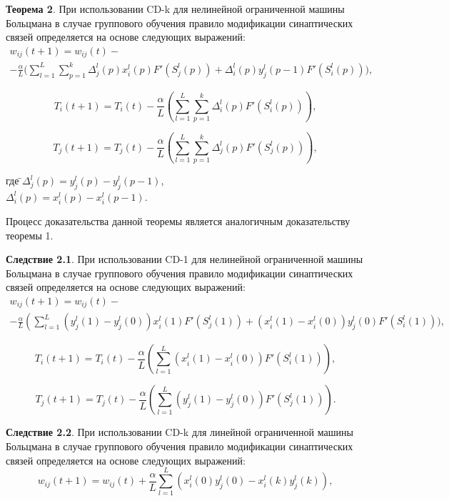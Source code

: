 \textbf{Теорема 2}. При использовании  CD-k для нелинейной ограниченной машины Больцмана в случае группового обучения правило модификации синаптических связей определяется на основе следующих выражений:
\begin{multline*}
    w_{ij}(t+1)=w_{ij}(t)-\\-\frac{\alpha}{L}\Bigg(\sum_{l=1}^L\sum_{p=1}^k\Delta_j^l(p)x_i^l(p)F'(S_j^l(p))+\Delta_i^l(p)y_j^l(p-1)F'(S_i^l(p))\Bigg),
\end{multline*}

\begin{equation*}
    T_{i}(t+1)=T_{i}(t)-\frac{\alpha}{L}\left(\sum_{l=1}^L\sum_{p=1}^k \Delta_i^l(p)F'(S_i^l(p))\right),
\end{equation*}

\begin{equation*}
    T_{j}(t+1)=T_{j}(t)-\frac{\alpha}{L}\left(\sum_{l=1}^L\sum_{p=1}^k \Delta_j^l(p)F'(S_j^l(p))\right),
\end{equation*}
\begin{tabbing}	
где \=$\Delta_j^l(p) = y_j^l(p)-y_j^l(p-1)$,\\
\>$\Delta_i^l(p) = x_i^l(p)-x_i^l(p-1)$.
\end{tabbing}

Процесс доказательства данной теоремы является аналогичным доказательству теоремы 1.

\textbf{Следствие 2.1}. При использовании  CD-1 для нелинейной ограниченной машины Больцмана в случае группового обучения правило модификации синаптических связей определяется на основе следующих выражений:
\begin{multline*}
    w_{ij}(t+1)=w_{ij}(t)-\\-\frac{\alpha}{L}\left(\sum_{l=1}^L (y_j^l(1)-y_j^l(0))x_i^l(1)F'(S_j^l(1))+(x_i^l(1)-x_i^l(0))y_j^l(0)F'(S_i^l(1))\Bigg)\right.,
\end{multline*}

\begin{equation*}
    T_i(t+1)=T_i(t)-\frac{\alpha}{L}\left(\sum_{l=1}^L (x_i^l(1)-x_i^l(0))F'(S_i^l(1))\right),
\end{equation*}

\begin{equation*}
    T_j(t+1)=T_j(t)-\frac{\alpha}{L}\left(\sum_{l=1}^L (y_j^l(1)-y_j^l(0))F'(S_j^l(1))\right).
\end{equation*}

\textbf{Следствие 2.2}. При использовании  CD-k для линейной ограниченной машины Больцмана в случае группового обучения правило модификации синаптических связей определяется на основе следующих выражений:
\begin{equation*}
    w_{ij}(t+1)=w_{ij}(t)+\frac{\alpha}{L}\sum_{l=1}^L (x_i^l(0)y_j^l(0)-x_i^l(k)y_j^l(k)),
\end{equation*}

